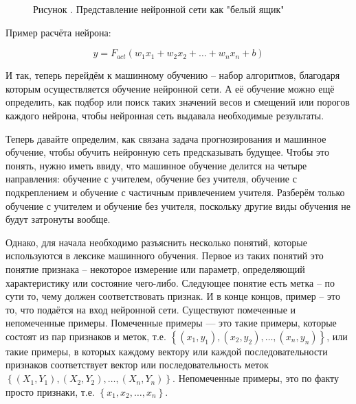 {  \begin{figure}[H]
    \centering
    \def\svgwidth{\textwidth}
    
    \caption*{\gostFont Рисунок \thechaptercntr .\theimagecntr \spc {--} Представление нейронной сети как "белый ящик"}
    \label{fig:Neuron}
  \end{figure} \addtocounter{imagecntr}{1}

  \par \redline Пример расчёта нейрона:

  \begin{equation} \tag{\thechaptercntr .\theformulacntr}
    y = F_{act}\left(w_1x_1 + w_2x_2 + \dots + w_nx_n + b\right)
  \end{equation} \addtocounter{formulacntr}{1}

  \par \redline И так, теперь перейдём к машинному обучению – набор алгоритмов, благодаря которым осуществляется обучение нейронной сети. А её обучение можно ещё определить, как подбор или поиск таких значений весов и смещений или порогов каждого нейрона, чтобы нейронная сеть выдавала необходимые результаты. 

  \par \redline Теперь давайте определим, как связана задача прогнозирования и машинное обучение, чтобы обучить нейронную сеть предсказывать будущее. Чтобы это понять, нужно иметь ввиду, что машинное обучение делится на четыре направления: обучение с учителем, обучение без учителя, обучение с подкреплением и обучение с частичным привлечением учителя. Разберём только обучение с учителем и обучение без учителя, поскольку другие виды обучения не будут затронуты вообще. 

  \par \redline Однако, для начала необходимо разъяснить несколько понятий, которые используются в лексике машинного обучения. Первое из таких понятий это понятие признака – некоторое измерение или параметр, определяющий характеристику или состояние чего-либо. Следующее понятие есть метка – по сути то, чему должен соответствовать признак.  И в конце концов, пример – это то, что подаётся на вход нейронной сети. Существуют помеченные и непомеченные примеры. Помеченные примеры — это такие примеры, которые состоят из пар признаков и меток, т.е. $\left\{\left(x_{1}, y_{1}\right), \left(x_{2}, y_{2}\right), \dots, \left(x_{n}, y_{n}\right)\right\}$, или такие примеры, в которых каждому вектору или каждой последовательности признаков соответствует вектор или последовательность меток $\left\{\left(X_{1}, Y_{1}\right), \left(X_{2}, Y_{2}\right), \dots, \left(X_{n}, Y_{n}\right)\right\}$. Непомеченные примеры, это по факту просто признаки, т.е. $\left\{x_{1}, x_{2}, \dots, x_{n}\right\}$. 

}
